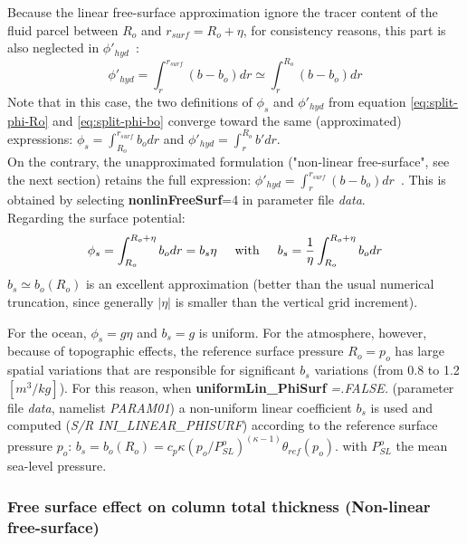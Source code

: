 Because the linear free-surface approximation ignore the tracer content
of the fluid parcel between $R_o$ and $r_{surf}=R_o+\eta$,
for consistency reasons, this part is also neglected in $\phi'_{hyd}$~:
$$
\phi'_{hyd} = \int^{r_{surf}}_r (b - b_o) dr \simeq \int^{R_o}_r (b - b_o) dr
$$
Note that in this case, the two definitions of $\phi_s$ and $\phi'_{hyd}$
from equation \ref{eq:split-phi-Ro} and \ref{eq:split-phi-bo} converge toward
the same (approximated) expressions: $\phi_s = \int^{r_{surf}}_{R_o} b_o dr$
and $\phi'_{hyd}=\int^{R_o}_r b' dr$.\\
On the contrary, the unapproximated formulation ("non-linear free-surface",
see the next section) retains the full expression:
$\phi'_{hyd} = \int^{r_{surf}}_r (b - b_o) dr $~.
This is obtained by selecting {\bf nonlinFreeSurf}=4 in parameter
file {\em data}.\\

Regarding the surface potential:
$$\phi_s = \int_{R_o}^{R_o+\eta} b_o dr = b_s \eta
\hspace{5mm}\mathrm{with}\hspace{5mm}
b_s = \frac{1}{\eta} \int_{R_o}^{R_o+\eta} b_o dr $$
$b_s \simeq b_o(R_o)$ is an excellent approximation (better than
the usual numerical truncation, since generally $|\eta|$ is smaller
than the vertical grid increment).

For the ocean, $\phi_s = g \eta$ and $b_s = g$ is uniform.
For the atmosphere, however, because of topographic effects, the
reference surface pressure $R_o=p_o$ has large spatial variations that
are responsible for significant $b_s$ variations (from 0.8 to 1.2
$[m^3/kg]$). For this reason, when {\bf uniformLin\_PhiSurf} {\em=.FALSE.}
(parameter file {\em data}, namelist {\em PARAM01})
a non-uniform linear coefficient $b_s$ is used and computed
({\it S/R INI\_LINEAR\_PHISURF}) according to the reference surface
pressure $p_o$:
$b_s = b_o(R_o) = c_p \kappa (p_o / P^o_{SL})^{(\kappa - 1)} \theta_{ref}(p_o)$.
with $P^o_{SL}$ the mean sea-level pressure.


\subsubsection{Free surface effect on column total thickness
(Non-linear free-surface)}

